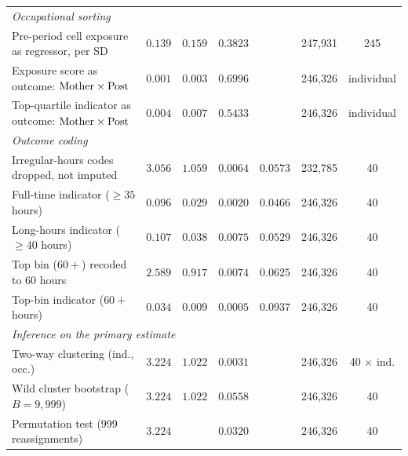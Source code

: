 \begin{tabular}{lcccccc}
\multicolumn{7}{l}{\emph{Occupational sorting}} \\
\quad Pre-period cell exposure as regressor, per SD & $0.139$ & $0.159$ & $0.3823$ &  & 247{,}931 & 245 \\
\quad Exposure score as outcome: $\text{Mother} \times \text{Post}$ & $0.001$ & $0.003$ & $0.6996$ &  & 246{,}326 & individual \\
\quad Top-quartile indicator as outcome: $\text{Mother} \times \text{Post}$ & $0.004$ & $0.007$ & $0.5433$ &  & 246{,}326 & individual \\
\multicolumn{7}{l}{\emph{Outcome coding}} \\
\quad Irregular-hours codes dropped, not imputed & $3.056$\sym{**} & $1.059$ & $0.0064$ & $0.0573$ & 232{,}785 & 40 \\
\quad Full-time indicator ($\geq 35$ hours) & $0.096$\sym{**} & $0.029$ & $0.0020$ & $0.0466$ & 246{,}326 & 40 \\
\quad Long-hours indicator ($\geq 40$ hours) & $0.107$\sym{**} & $0.038$ & $0.0075$ & $0.0529$ & 246{,}326 & 40 \\
\quad Top bin ($60+$) recoded to 60 hours & $2.589$\sym{**} & $0.917$ & $0.0074$ & $0.0625$ & 246{,}326 & 40 \\
\quad Top-bin indicator ($60+$ hours) & $0.034$\sym{***} & $0.009$ & $0.0005$ & $0.0937$ & 246{,}326 & 40 \\
\multicolumn{7}{l}{\emph{Inference on the primary estimate}} \\
\quad Two-way clustering (ind., occ.) & $3.224$\sym{**} & $1.022$ & $0.0031$ &  & 246{,}326 & 40 $\times$ ind. \\
\quad Wild cluster bootstrap ($B = 9{,}999$) & $3.224$ & $1.022$ & $0.0558$ &  & 246{,}326 & 40 \\
\quad Permutation test (999 reassignments) & $3.224$ &  & $0.0320$ &  & 246{,}326 & 40 \\
\bottomrule
\end{tabular}
